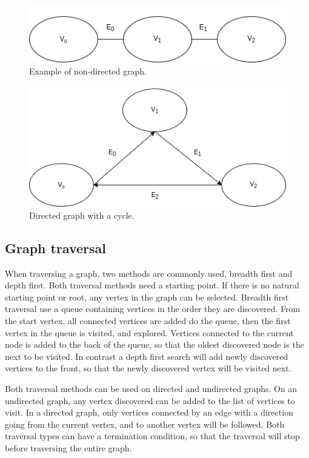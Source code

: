 \begin{figure}
    \centering
    \includegraphics[scale=0.5]{figs/simpleAG.png}
    \caption{Example of non-directed graph.}
    \label{fig:DAGvsAG}
\end{figure}

\begin{figure}
    \centering
    \includegraphics[scale=0.5]{figs/triangleDG.png}
    \caption{Directed graph with a cycle.}
    \label{fig:DAGvsDG}
\end{figure}

\subsection{Graph traversal}
When traversing a graph, two methods are commonly used, breadth first and depth first. Both traversal methods need a starting point. If there is no natural starting point or root, any vertex in the graph can be selected. Breadth first traversal use a queue containing vertices in the order they are discovered. From the start vertex, all connected vertices are added do the queue, then the first vertex in the queue is visited, and explored. Vertices connected to the current node is added to the back of the queue, so that the oldest discovered node is the next to be visited. In contrast a depth first search will add newly discovered vertices to the front, so that the newly discovered vertex will be visited next.

Both traversal methods can be used on directed and undirected graphs. On an undirected graph, any vertex discovered can be added to the list of vertices to visit. In a directed graph, only vertices connected by an edge with a direction going from the current vertex, and to another vertex will be followed. Both traversal types can have a termination condition, so that the traversal will stop before traversing the entire graph.

